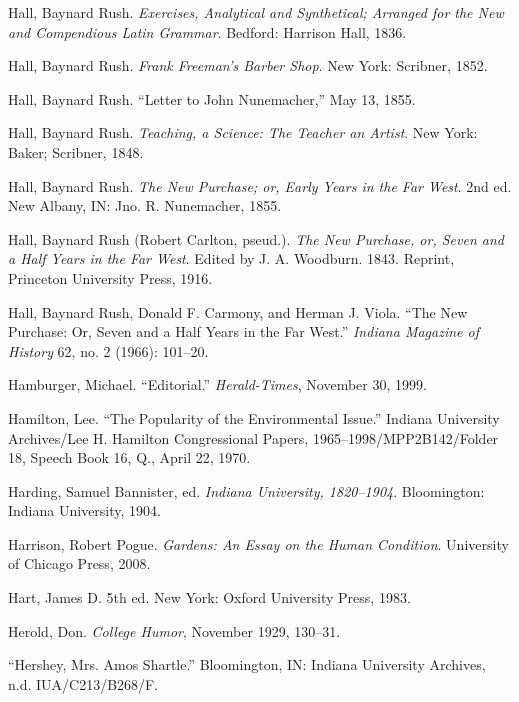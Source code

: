 \documentclass[
  american,
  letterpaper,
]{scrreprt}
\newlength{\cslhangindent}
\newenvironment{CSLReferences}[2] %
 {\begin{list}{}{%
  \setlength{\itemindent}{0pt}
  \setlength{\leftmargin}{0pt}
  \setlength{\parsep}{0pt}
  \ifodd #1
   \setlength{\leftmargin}{\cslhangindent}
   \setlength{\itemindent}{-1\cslhangindent}
  \fi
  \setlength{\itemsep}{#2\baselineskip}}}
 {\end{list}}
\begin{document}
\begin{CSLReferences}{1}{0}
Hall, Baynard Rush. \emph{Exercises, Analytical and Synthetical;
Arranged for the New and Compendious Latin Grammar}. Bedford: Harrison
Hall, 1836.

Hall, Baynard Rush. \emph{Frank Freeman's Barber Shop}. New York:
Scribner, 1852.

Hall, Baynard Rush. {``Letter to John Nunemacher,''} May 13, 1855.

Hall, Baynard Rush. \emph{Teaching, a Science: The Teacher an Artist}.
New York: Baker; Scribner, 1848.

Hall, Baynard Rush. \emph{The New Purchase; or, Early Years in the Far
West}. 2nd ed. New Albany, IN: Jno. R. Nunemacher, 1855.

Hall, Baynard Rush (Robert Carlton, pseud.). \emph{The New Purchase, or,
Seven and a Half Years in the Far West}. Edited by J. A. Woodburn. 1843.
Reprint, Princeton University Press, 1916.

Hall, Baynard Rush, Donald F. Carmony, and Herman J. Viola. {``The New
Purchase: Or, Seven and a Half Years in the Far West.''} \emph{Indiana
Magazine of History} 62, no. 2 (1966): 101--20.

Hamburger, Michael. {``Editorial.''} \emph{Herald-Times}, November 30,
1999.

Hamilton, Lee. {``The Popularity of the Environmental Issue.''} Indiana
University Archives/Lee H. Hamilton Congressional Papers,
1965--1998/MPP2B142/Folder 18, Speech Book 16, Q., April 22, 1970.

Harding, Samuel Bannister, ed. \emph{Indiana University, 1820--1904}.
Bloomington: Indiana University, 1904.

Harrison, Robert Pogue. \emph{Gardens: An Essay on the Human Condition}.
University of Chicago Press, 2008.

Hart, James D. 5th ed. New York: Oxford University Press, 1983.

Herold, Don. \emph{College Humor}, November 1929, 130--31.

{``Hershey, Mrs. Amos Shartle.''} Bloomington, IN: Indiana University
Archives, n.d. IUA/C213/B268/F.


\end{CSLReferences}
\end{document}
